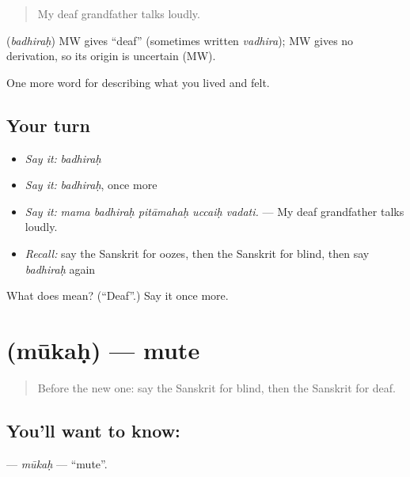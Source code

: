\begin{quote}
My deaf grandfather talks loudly.
\end{quote}

\begin{cousinweb}
\textbf{} (\emph{badhiraḥ}) MW gives \textquotedblleft{}deaf\textquotedblright{} (sometimes written \emph{vadhira}); MW gives no derivation, so its origin is uncertain (MW).
\end{cousinweb}

\begin{grammarlens}[title={What you've built}]
One more word for describing what you lived and felt.
\end{grammarlens}

\subsection*{Your turn}
\begin{itemize}
\raggedright
  \item \emph{Say it:} \emph{badhiraḥ}
  \item \emph{Say it:} \emph{badhiraḥ}, once more
  \item \emph{Say it:} \emph{mama badhiraḥ pitāmahaḥ uccaiḥ vadati.} — My deaf grandfather talks loudly.
  \item \emph{Recall:} say the Sanskrit for oozes, then the Sanskrit for blind, then say \emph{badhiraḥ} again
\end{itemize}

\begin{tcolorbox}[breakable,colback=teal!4,colframe=teal!35!black,title={Before you move on}]
What does  mean? (\textquotedblleft{}Deaf\textquotedblright{}.) Say it once more.
\end{tcolorbox}
\section[\texorpdfstring{\sk{मूकः} (mūkaḥ)}{मूकः (mūkaḥ)}]{ (mūkaḥ) — mute}

\label{lesson:SA-C481-mukah}



\begin{quote}
Before the new one: say the Sanskrit for blind, then the Sanskrit for deaf.
\end{quote}

\subsection*{You'll want to know: }
\textbf{} — \emph{mūkaḥ} — \textquotedblleft{}mute\textquotedblright{}.

